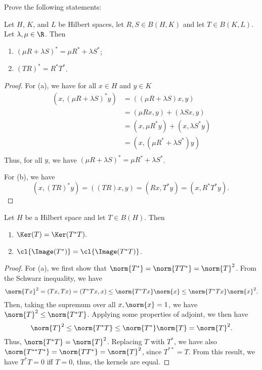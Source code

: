 \documentclass[12pt,letterpaper,twoside]{hmcpset}
\begin{document}
\noindent Prove the following statements:

\begin{problem}[1]
  Let $H$, $K$, and $L$ be Hilbert spaces, let $R,S \in B(H,K)$ and let $T \in B(K,L)$. Let $\lambda, \mu \in \R$.
  Then
  \begin{enumerate}[label=(\alph*)]
  \item $(\mu R + \lambda S)^* = \mu R^* + \lambda S^*$;
  \item $(TR)^* = R^*T^*$.
  \end{enumerate}
\end{problem}

\begin{solution}
  \begin{proof}
    For (a), we have for all $x \in H$ and $y \in K$
    \begin{align*}
      (x,(\mu R + \lambda S)^* y) &= ((\mu R + \lambda S) x, y) \\
      {} &= (\mu Rx, y) + (\lambda Sx, y) \\
      {} &= (x, \mu R^* y) + (x, \lambda S^* y) \\
      {} &= (x, (\mu R^* + \lambda S^*) y )\\
    \end{align*}
    Thus, for all $y$, we have $(\mu R + \lambda S)^* = \mu R^* + \lambda S^*$.

    For (b), we have \[
    (x,(TR)^* y) = ((TR)x, y) = (Rx, T^*y) = (x, R^*T^*y).\
    \]

  \end{proof}
\end{solution}

\begin{problem}[2]
  Let $H$ be a Hilbert space and let $T \in B(H)$. Then
  \begin{enumerate}[label=(\alph*)]
  \item $\Ker(T) = \Ker(T^*T).$
  \item $\cl{\Image(T^*)} = \cl{\Image(T^*T)}$.
  \end{enumerate}
\end{problem}

\begin{solution}
  \begin{proof}
    \label{prf:1}
    For (a), we first show that $\norm{T^*} = \norm{TT^*} = \norm{T}^2$.
    From the Schwarz inequality, we have \[
    \norm{Tx}^2 = (Tx, Tx) = (T^*Tx, x) \leq \norm{T^*Tx}\norm{x} \leq \norm{T^*Tx}\norm{x}^2. 
    \]
    Then, taking the supremum over all $x, \norm{x} = 1$, we have $\norm{T}^2 \leq \norm{T^*T}$.
    Applying some properties of adjoint, we then have \[
    \norm{T}^2 \leq \norm{T^*T} \leq \norm{T^*}\norm{T} = \norm{T}^2.
    \]
    Thus, $\norm{T^*T} = \norm{T}^2$. 
    Replacing $T$ with $T^*$, we have also $\norm{T^{**}T^*} = \norm{TT^*} = \norm{T}^2$, since $T^{**} = T$.
    From this result, we have $T^*T = 0$ iff $T = 0$, thus, the kernels are equal.
  \end{proof}
\end{solution}
\end{document}
